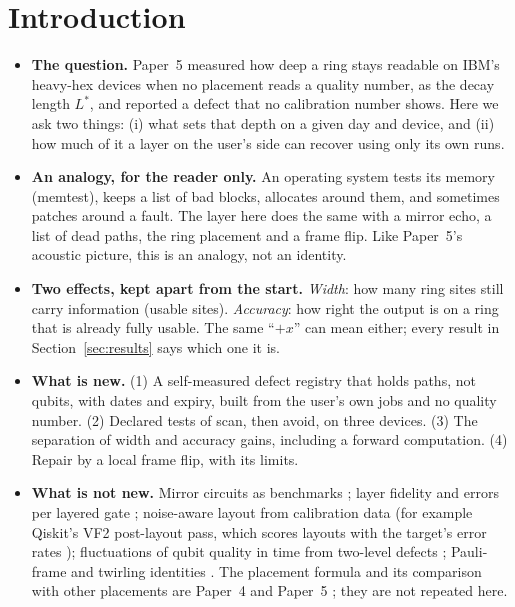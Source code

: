 \documentclass[11pt]{article}
\begin{document}
\section{Introduction}

\begin{itemize}
\item \textbf{The question.} Paper~5 \cite{paper5} measured how deep a ring stays readable on IBM's heavy-hex devices
  when no placement reads a quality number, as the decay length $L^*$, and reported a defect that no calibration
  number shows. Here we ask two things: (i) what sets that depth on a given day and device, and (ii) how much of it a
  layer on the user's side can recover using only its own runs.
\item \textbf{An analogy, for the reader only.} An operating system tests its memory (memtest), keeps a list of bad
  blocks, allocates around them, and sometimes patches around a fault. The layer here does the same with a mirror echo,
  a list of dead paths, the ring placement and a frame flip. Like Paper~5's acoustic picture, this is an analogy, not
  an identity.
\item \textbf{Two effects, kept apart from the start.} \emph{Width}: how many ring sites still carry information
  (usable sites). \emph{Accuracy}: how right the output is on a ring that is already fully usable. The same ``$+x$'' can
  mean either; every result in Section~\ref{sec:results} says which one it is.
\item \textbf{What is new.} (1) A self-measured defect registry that holds paths, not qubits, with dates and expiry,
  built from the user's own jobs and no quality number. (2) Declared tests of scan, then avoid, on three devices. (3)
  The separation of width and accuracy gains, including a forward computation. (4) Repair by a local frame flip, with
  its limits.
\item \textbf{What is not new.} Mirror circuits as benchmarks \cite{proctor2022}; layer fidelity and errors per layered
  gate \cite{mckay2023}; noise-aware layout from calibration data (for example Qiskit's VF2 post-layout pass, which
  scores layouts with the target's error rates \cite{vf2post}); fluctuations of qubit quality in time from two-level
  defects \cite{klimov2018}; Pauli-frame and twirling identities \cite{wallman2016}. The placement formula and its
  comparison with other placements are Paper~4 \cite{paper4} and Paper~5 \cite{paper5}; they are not repeated here.
\end{itemize}
\end{document}
